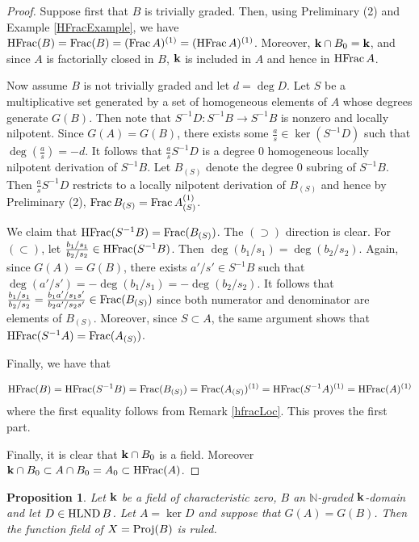 \documentclass[12pt]{amsart}
\theoremstyle{plain}
\newtheorem{proposition}[subsection]{Proposition}
\theoremstyle{definition}
\newcommand{\Proj}{		\operatorname{{\rm Proj}}}
\newcommand{\Frac}{		\operatorname{{\rm Frac}}}
\newcommand{\HFrac}{		\operatorname{{\rm HFrac}}}
\newcommand{\Nat}{\ensuremath{\mathbb{N}}}
\newcommand{\bk}{{\ensuremath{\rm \bf k}}}
\newcommand{\hlnd}{\operatorname{{\rm HLND}}}
\begin{document}
\begin{proof}
Suppose first that $B$ is trivially graded. Then, using Preliminary (2) and Example \ref{HFracExample}, we have $\HFrac(B) = \Frac(B) = (\Frac A)^{(1)}  = (\HFrac A)^{(1)}$. Moreover, $\bk \cap B_0 = \bk$, and since $A$ is factorially closed in $B$, $\bk$ is included in $A$ and hence in $\HFrac A$.

Now assume $B$ is not trivially graded and let $d = \deg D$. Let $S$ be a multiplicative set generated by a set of homogeneous elements of $A$ whose degrees generate $G(B)$. Then note that $S^{-1}D : S^{-1}B \to S^{-1}B$ is nonzero and locally nilpotent. Since $G(A) = G(B)$, there exists some $\frac{a}{s} \in \ker(S^{-1}D)$ such that $\deg(\frac{a}{s}) = -d$. It follows that $\frac{a}{s} S^{-1}D$ is a degree 0 homogeneous locally nilpotent derivation of $S^{-1}B$. Let $B_{(S)}$ denote the degree 0 subring of $S^{-1}B$. Then $\frac{a}{s} S^{-1}D$ restricts to a locally nilpotent derivation of $B_{(S)}$ and hence by Preliminary (2), $\Frac B_{(S)} = \Frac A_{(S)}^{(1)}$.

We claim that $\HFrac(S^{-1}B) = \Frac(B_{(S)})$. The $(\supset)$ direction is clear. For $(\subset)$, let $\frac{b_1/s_1}{b_2/s_2} \in \HFrac(S^{-1}B)$. Then $\deg(b_1/s_1) = \deg(b_2/s_2)$. Again, since $G(A) = G(B)$, there exists $a'/s' \in S^{-1}B$ such that $\deg(a'/s') = -\deg(b_1/s_1) = -\deg(b_2/s_2)$. It follows that $\frac{b_1/s_1}{b_2/s_2} = \frac{b_1 a' / s_1 s'}{b_2 a' / s_2 s'} \in \Frac(B_{(S)})$ since both numerator and denominator are elements of $B_{(S)}$. Moreover, since $S \subset A$, the same argument shows that $\HFrac(S^{-1}A) = \Frac(A_{(S)})$.

Finally,  we have that 

$$\HFrac(B) = \HFrac(S^{-1}B) = \Frac(B_{(S)}) = \Frac(A_{(S)})^{(1)} = \HFrac(S^{-1}A)^{(1)} = \HFrac(A)^{(1)}$$ where the first equality follows from Remark \ref{hfracLoc}. This proves the first part. 

Finally, it is clear that $\bk \cap B_0$ is a field. Moreover $\bk \cap B_0 \subset A \cap B_0 = A_0 \subset \HFrac(A)$. 


\end{proof}

\begin{proposition} \label{mainResult} Let $\bk$ be a field of characteristic zero, $B$ an $\Nat$-graded $\bk$-domain and let $D \in \hlnd B$. Let $A = \ker D$ and suppose that $G(A) = G(B)$. Then the function field of $X = \Proj(B)$ is ruled.
\end{proposition}
\end{document}
